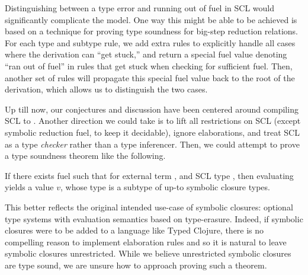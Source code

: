 Distinguishing between a type error
and running out of fuel in SCL would significantly complicate the model.
One way this might be able to be achieved is based on a technique for
proving type soundness for big-step reduction relations.
For each type and subtype rule, we add extra rules to explicitly
handle all cases where the derivation can ``get stuck,''
and return a special fuel value denoting ``ran out of fuel'' in rules
that get stuck when checking for sufficient fuel.
Then, another set of rules will propagate this special fuel value
back to the root of the derivation, which allows us to distinguish
the two cases.


Up till now, our conjectures and discussion have been centered around compiling SCL to \ltiFsub.
Another direction we could take is to lift all restrictions
on SCL (except symbolic reduction fuel, to keep it decidable),
ignore elaborations, and treat SCL as a type \emph{checker} rather than a
type inferencer.
Then, we could attempt to prove a type soundness theorem
like the following.

\begin{conjecture}
  If there exists fuel {\ltiFuel{}} such that
     \ltitSstkjudgementNoElab{\ltiFuel{}}
                       {\ltiEmptyEnv}
                       {\ltiE{}}
                       {\ltiT{}}
                       {\ltiFuelp{}}
                       {\ltiEp{}}
  for external term \ltiE{}, and
                       SCL type \ltiT{},
                      then
  evaluating {\ltiE{}}
                       yields a value $v$, whose type \ltiTp{}
                       is a subtype of
                       {\ltiT{}} up-to symbolic closure types.
\end{conjecture}

This better reflects the original intended use-case of symbolic closures:
optional type systems with evaluation semantics based on type-erasure.
Indeed, if symbolic closures were to be added to a language like Typed Clojure,
there is no compelling reason to implement elaboration rules and so it is
natural to leave symbolic closures unrestricted. While we believe unrestricted
symbolic closures are type sound, we are unsure how to approach proving such
a theorem.

